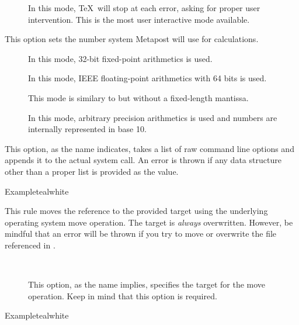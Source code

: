 \begin{description}
\begin{description}
\begin{description}
\item[] In this mode, \TeX\ will stop at each error, asking for proper user intervention. This is the most user interactive mode available.
\end{description}

\item[\abox{numbersystem}] This option sets the number system Metapost will use for calculations.

\begin{description}
\item[] In this mode, 32-bit fixed-point arithmetics is used.

\item[] In this mode, IEEE floating-point arithmetics with 64 bits is used.
\item[] This mode is similary to  but without a fixed-length mantissa.
\item[] In this mode, arbitrary precision arithmetics is used and numbers are internally represented in base 10.
\end{description}

\item[\abox{options}] This option, as the name indicates, takes a list of raw command line options and appends it to the actual system call. An error is thrown if any data structure other than a proper list is provided as the value.
\end{description}

\begin{codebox}{Example}{teal}{\icnote}{white}
\end{codebox}

\item[\rulebox{move}]
This rule moves the  reference to the provided target using the underlying operating system move operation. The target is \emph{always} overwritten. However, be mindful that an error will be thrown if you try to move or overwrite the file referenced in .

\begin{description}
\item[~\rqbox] This option, as the name implies, specifies the target for the move operation. Keep in mind that this option is required.
\end{description}

\begin{codebox}{Example}{teal}{\icnote}{white}
\end{codebox}


\end{description}
